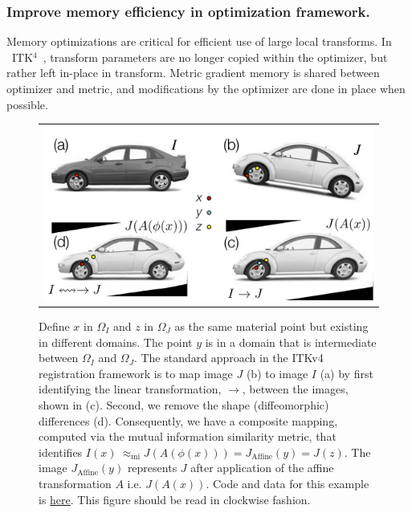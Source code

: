\documentclass{frontiersSCNS}
\newcommand{\tk}{~ITK$^{\text{4}}$~}
\begin{document}
\subsubsection{Improve memory efficiency in optimization framework.}
Memory optimizations are critical for efficient use of large local transforms.
In \tk, transform parameters are no longer copied within the optimizer, but rather left in-place in transform. 
Metric gradient memory is shared between optimizer and metric, and modifications by the optimizer  are done in place when possible.
\begin{figure}[t]
\begin{center}
\begin{tabular}{c}
\includegraphics[width=5in]{figs/RegistrationNomenclature.pdf}
\end{tabular}
\caption{\baselineskip 12pt \small Define $x$ in $\Omega_I$ and $z$ in
  $\Omega_J$ as the same material point but existing in different
  domains.  The point $y$ is in a domain that is intermediate between
  $\Omega_I$ and $\Omega_J$.  The standard approach in the ITKv4
  registration framework is to map image $J$ (b) to image $I$ (a) by first
  identifying the linear transformation, $\rightarrow$, between the images, shown in (c).  Second, we remove the shape (diffeomorphic)
  differences (d).  Consequently, we have a composite mapping, computed via the
  mutual information similarity metric, that identifies
  $I(x) ~\approx_\text{mi}  J(A(\phi(x))) =  J_\text{Affine}(y) = J(z)
  $. The image $J_\text{Affine}(y)$
  represents $J$ after application of the affine transformation $A$
  i.e. $J(A(x))$.  Code and data for this example is
  \href{http://stnava.github.io/cars/}{here}.  This figure should be
  read in clockwise fashion.}
\label{fig:composite}
\end{center}
\end{figure}
\end{document}
